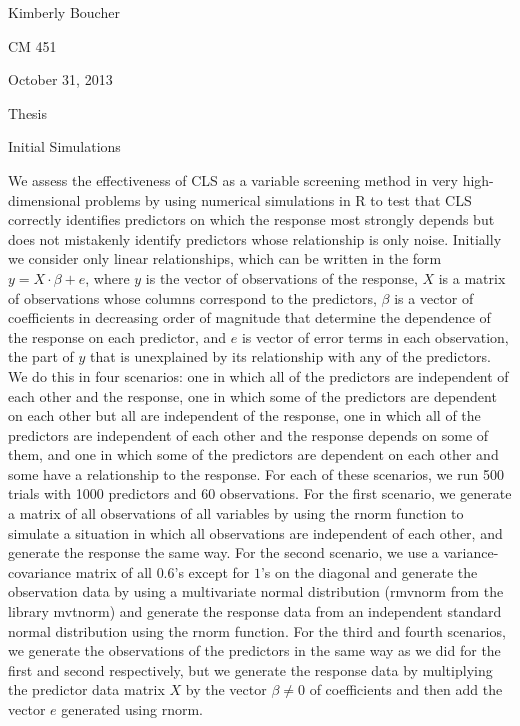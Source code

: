\documentclass[12pt]{article}%
\begin{document}
\hfill Kimberly Boucher

\hfill CM 451

\hfill October 31, 2013

\hfill Thesis


\begin{center}
{\Large Initial Simulations\\}
\end{center}

We assess the effectiveness of CLS as a variable screening method in very high-dimensional problems by using numerical simulations in R to test that CLS correctly identifies predictors on which the response most strongly depends but does not mistakenly identify predictors whose relationship is only noise. %
Initially we consider only linear relationships, which can be written in the form $y=X\cdot\beta+e$, where $y$ is the vector of observations of the response, $X$ is a matrix of observations whose columns correspond to the predictors, $\beta$ is a vector of coefficients in decreasing order of magnitude that determine the dependence of the response on each predictor, and $e$ is vector of error terms in each observation, the part of $y$ that is unexplained by its relationship with any of the predictors. 
We do this in four scenarios:
one in which all of the predictors are independent of each other and the response, 
one in which some of the predictors are dependent on each other but all are independent of the response, 
one in which all of the predictors are independent of each other and the response depends on some of them, 
and 
one in which some of the predictors are dependent on each other and some have a relationship to the response. %
For each of these scenarios, we run 500 trials with 1000 predictors and 60 observations. %
For the first scenario, we generate a matrix of all observations of all variables by using the rnorm function to simulate a situation in which all observations are independent of each other, and generate the response the same way. %
For the second scenario, we use a variance-covariance matrix of all $0.6$'s except for $1$'s on the diagonal and generate the observation data by using a multivariate normal distribution (rmvnorm from the library mvtnorm) and generate the response data from an independent standard normal distribution using the rnorm function. %
For the third and fourth scenarios, we generate the observations of the predictors in the same way as we did for the first and second respectively, but we generate the response data by multiplying the predictor data matrix $X$ by the vector $\beta\neq0$ of coefficients and then add the vector $e$ generated using rnorm.
\end{document}

